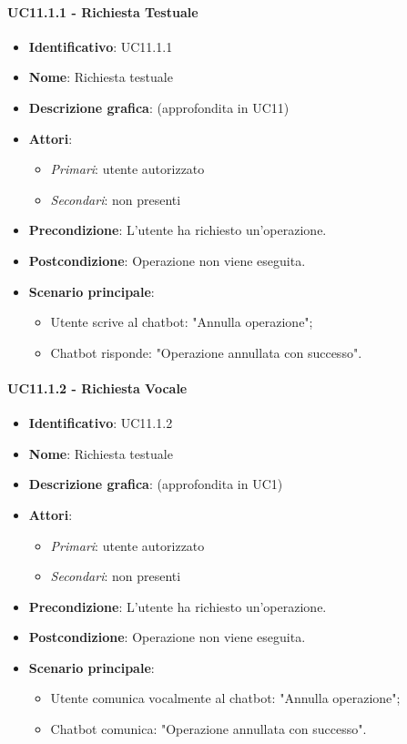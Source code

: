 \paragraph{UC11.1.1 - Richiesta Testuale}
\begin{itemize}
   \item \textbf{Identificativo}: UC11.1.1
   \item \textbf{Nome}: Richiesta testuale
   \item \textbf{Descrizione grafica}: (approfondita in UC11)
   \item \textbf{Attori}:
   \begin{itemize} 
       \item \textit{Primari}: utente autorizzato
       \item \textit{Secondari}: non presenti
   \end{itemize}
       \item \textbf{Precondizione}: L'utente ha richiesto un'operazione.
       \item \textbf{Postcondizione}: Operazione non viene eseguita. 
    \item \textbf{Scenario principale}: 
       \begin{itemize}
        \item Utente scrive al chatbot: "Annulla operazione";
        \item Chatbot risponde: "Operazione annullata con successo".
       \end{itemize}
\end{itemize}

\paragraph{UC11.1.2 - Richiesta Vocale}
\begin{itemize}
   \item \textbf{Identificativo}: UC11.1.2
   \item \textbf{Nome}: Richiesta testuale
   \item \textbf{Descrizione grafica}: (approfondita in UC1)
   \item \textbf{Attori}:
   \begin{itemize} 
       \item \textit{Primari}: utente autorizzato
       \item \textit{Secondari}: non presenti
   \end{itemize}
       \item \textbf{Precondizione}: L'utente ha richiesto un'operazione.
       \item \textbf{Postcondizione}: Operazione non viene eseguita. 
    \item \textbf{Scenario principale}: 
       \begin{itemize}
        \item Utente comunica vocalmente al chatbot: "Annulla operazione";
        \item Chatbot comunica: "Operazione annullata con successo".
       \end{itemize}
\end{itemize}

